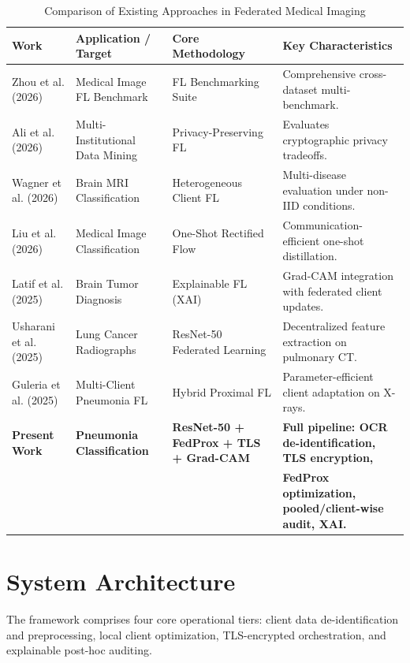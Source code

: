 \documentclass[journal]{IEEEtran}
\begin{document}
\begin{table}[t]
\centering
\caption{Comparison of Existing Approaches in Federated Medical Imaging}
\label{tab:related_work}
\begin{tabular}{llll}
\toprule
\textbf{Work} & \textbf{Application / Target} & \textbf{Core Methodology} & \textbf{Key Characteristics} \\
\midrule
Zhou et al. (2026) \cite{zhou2026federated} & Medical Image FL Benchmark & FL Benchmarking Suite & Comprehensive cross-dataset multi-benchmark. \\
Ali et al. (2026) \cite{ali2026privacy} & Multi-Institutional Data Mining & Privacy-Preserving FL & Evaluates cryptographic privacy tradeoffs. \\
Wagner et al. (2026) \cite{wagner2026feasibility} & Brain MRI Classification & Heterogeneous Client FL & Multi-disease evaluation under non-IID conditions. \\
Liu et al. (2026) \cite{liu2026new} & Medical Image Classification & One-Shot Rectified Flow & Communication-efficient one-shot distillation. \\
Latif et al. (2025) \cite{latif2025explainable} & Brain Tumor Diagnosis & Explainable FL (XAI) & Grad-CAM integration with federated client updates. \\
Usharani et al. (2025) \cite{usharani2025fedlres} & Lung Cancer Radiographs & ResNet-50 Federated Learning & Decentralized feature extraction on pulmonary CT. \\
Guleria et al. (2025) \cite{guleria2025fedpneu} & Multi-Client Pneumonia FL & Hybrid Proximal FL & Parameter-efficient client adaptation on X-rays. \\
\textbf{Present Work} & \textbf{Pneumonia Classification} & \textbf{ResNet-50 + FedProx + TLS + Grad-CAM} & \textbf{Full pipeline: OCR de-identification, TLS encryption,} \\
 & & & \textbf{FedProx optimization, pooled/client-wise audit, XAI.} \\
\bottomrule
\end{tabular}
\end{table}

\section{System Architecture}
The framework comprises four core operational tiers: client data de-identification and preprocessing, local client optimization, TLS-encrypted orchestration, and explainable post-hoc auditing.
\end{document}
